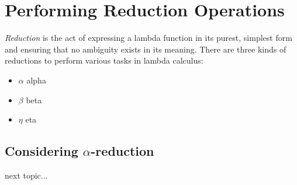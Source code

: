\section{Performing Reduction Operations}
\emph{Reduction} is the act of expressing a lambda function in its purest, simplest form and ensuring that no ambiguity exists in its meaning. There are three kinds of reductions to perform various tasks in lambda calculus:
\begin{itemize}
\item $\alpha$ alpha 
\item $\beta$ beta
\item $\eta$ eta
\end{itemize}
\subsection{Considering $\alpha$-reduction}
next topic...

